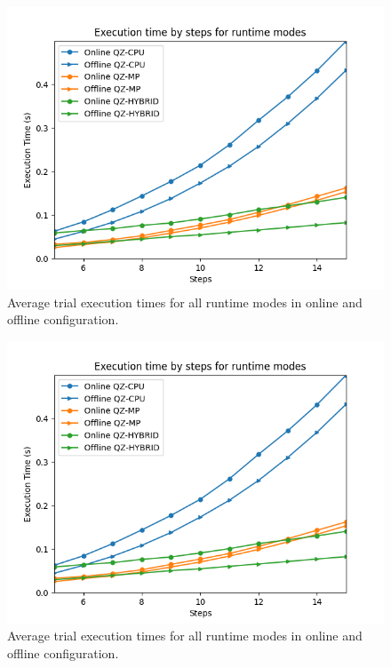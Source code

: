 \documentclass[runningheads]{llncs}
\begin{document}
\begin{figure}[H]
\includegraphics[width=\textwidth]{profiler_out/all_avg_unified.png}
\caption{Average trial execution times for all runtime modes in online and offline configuration.} \label{fig1}
\end{figure}
\begin{figure}[H]
\includegraphics[width=\textwidth]{profiler_out/all_avg_unified.png}
\caption{Average trial execution times for all runtime modes in online and offline configuration.} \label{fig1}
\end{figure}
\end{document}
